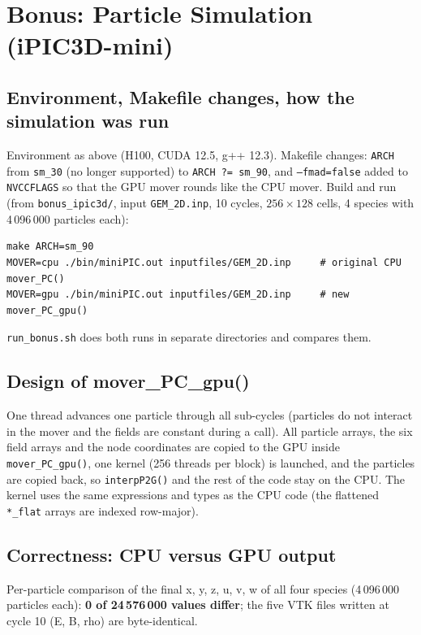 \documentclass[11pt,a4paper]{article}
\begin{document}
\section{Bonus: Particle Simulation (iPIC3D-mini)}

\subsection{Environment, Makefile changes, how the simulation was run}
Environment as above (H100, CUDA 12.5, g++ 12.3). Makefile changes: \texttt{ARCH} from \texttt{sm\_30} (no longer
supported) to \texttt{ARCH ?= sm\_90}, and \texttt{--fmad=false} added to \texttt{NVCCFLAGS} so that the GPU mover
rounds like the CPU mover. Build and run (from \texttt{bonus\_ipic3d/}, input \texttt{GEM\_2D.inp}, 10 cycles,
$256\times128$ cells, 4 species with 4\,096\,000 particles each):
\begin{lstlisting}
make ARCH=sm_90
MOVER=cpu ./bin/miniPIC.out inputfiles/GEM_2D.inp     # original CPU mover_PC()
MOVER=gpu ./bin/miniPIC.out inputfiles/GEM_2D.inp     # new mover_PC_gpu()
\end{lstlisting}
\texttt{run\_bonus.sh} does both runs in separate directories and compares them.

\subsection{Design of mover\_PC\_gpu()}
One thread advances one particle through all sub-cycles (particles do not interact in the mover and the fields are
constant during a call). All particle arrays, the six field arrays and the node coordinates are copied to the GPU
inside \texttt{mover\_PC\_gpu()}, one kernel (256 threads per block) is launched, and the particles are copied back, so
\texttt{interpP2G()} and the rest of the code stay on the CPU. The kernel uses the same expressions and types as the CPU code
(the flattened \texttt{*\_flat} arrays are indexed row-major).

\subsection{Correctness: CPU versus GPU output}

Per-particle comparison of the final x, y, z, u, v, w of all four species (4\,096\,000 particles each):
\textbf{0 of 24\,576\,000 values differ}; the five VTK files written at cycle 10 (E, B, rho) are byte-identical.
\end{document}
